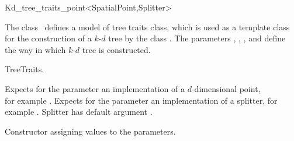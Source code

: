 

\begin{ccRefClass}{Kd_tree_traits_point<SpatialPoint,Splitter>}  %


\ccDefinition
  
The class \ccRefName\ defines a model of tree traits class, which is used as
a template class for the construction of a $k$-$d$ tree by the class .
The parameters , , , and   
define the way in which $k$-$d$ tree is constructed.



\ccIsModel

TreeTraits.

\ccParameters

Expects for the parameter  an implementation of a $d$-dimensional point, \\
for example .
Expects for the parameter  an implementation of a splitter, for
example .
Splitter has default argument .

\ccTypes


\ccCreation
{}  %



{Constructor assigning values to the parameters.}


\end{ccRefClass}
